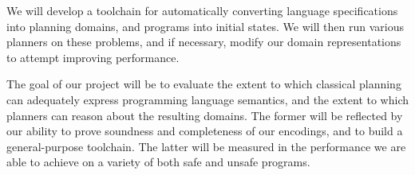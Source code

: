 \documentclass{article}
\begin{document}
We will develop a toolchain for automatically converting language specifications
into planning domains, and programs into initial states. We will then run
various planners on these problems, and if necessary, modify our domain
representations to attempt improving performance.

The goal of our project will be to evaluate the extent to which classical
planning can adequately express programming language semantics, and the extent
to which planners can reason about the resulting domains. The former will be
reflected by our ability to prove soundness and completeness of our encodings,
and to build a general-purpose toolchain. The latter will be measured in the
performance we are able to achieve on a variety of both safe and unsafe
programs.
\end{document}
